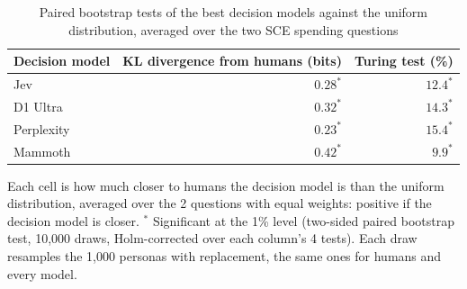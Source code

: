 \begin{table}[htbp]
\centering
\caption{Paired bootstrap tests of the best decision models against the uniform distribution, averaged over the two SCE spending questions}
\label{tab:sce_bootstrap_uniform}
\begin{tabular}{lrr}
\toprule
Decision model & KL divergence from humans (bits) & Turing test (\%) \\
\midrule
Jev & $0.28^{*}$ & $12.4^{*}$ \\
D1 Ultra & $0.32^{*}$ & $14.3^{*}$ \\
Perplexity & $0.23^{*}$ & $15.4^{*}$ \\
Mammoth & $0.42^{*}$ & $9.9^{*}$ \\
\bottomrule
\end{tabular}
\par\smallskip
\parbox{\linewidth}{\footnotesize Each cell is how much closer to humans the decision model is than the uniform distribution, averaged over the 2 questions with equal weights: positive if the decision model is closer. $^{*}$ Significant at the 1\% level (two-sided paired bootstrap test, 10,000 draws, Holm-corrected over each column's 4 tests). Each draw resamples the 1,000 personas with replacement, the same ones for humans and every model.}
\end{table}
